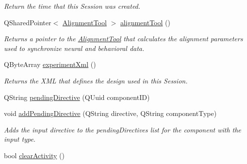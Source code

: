 \begin{DoxyCompactItemize}
\begin{DoxyCompactList}\small\item\em Return the time that this Session was created. \end{DoxyCompactList}\item 
\hypertarget{class_session_info_a2e1de58e8d906893dcc032d7e64a56ec}{Q\-Shared\-Pointer$<$ \hyperlink{class_alignment_tool}{Alignment\-Tool} $>$ \hyperlink{class_session_info_a2e1de58e8d906893dcc032d7e64a56ec}{alignment\-Tool} ()}\label{class_session_info_a2e1de58e8d906893dcc032d7e64a56ec}

\begin{DoxyCompactList}\small\item\em Returns a pointer to the \hyperlink{class_alignment_tool}{Alignment\-Tool} that calculates the alignment parameters used to synchronize neural and behavioral data. \end{DoxyCompactList}\item 
\hypertarget{class_session_info_a593b3687ba0495289109aa1b314ff718}{Q\-Byte\-Array \hyperlink{class_session_info_a593b3687ba0495289109aa1b314ff718}{experiment\-Xml} ()}\label{class_session_info_a593b3687ba0495289109aa1b314ff718}

\begin{DoxyCompactList}\small\item\em Returns the X\-M\-L that defines the design used in this Session. \end{DoxyCompactList}\item 
Q\-String \hyperlink{class_session_info_ae276671aa1731856342b9ca9ab4b5304}{pending\-Directive} (Q\-Uuid component\-I\-D)
\item 
\hypertarget{class_session_info_a2bd4edad0e169c5cd4e64723ade7208e}{void \hyperlink{class_session_info_a2bd4edad0e169c5cd4e64723ade7208e}{add\-Pending\-Directive} (Q\-String directive, Q\-String component\-Type)}\label{class_session_info_a2bd4edad0e169c5cd4e64723ade7208e}

\begin{DoxyCompactList}\small\item\em Adds the input directive to the pending\-Directives list for the component with the input type. \end{DoxyCompactList}\item 
\hypertarget{class_session_info_ae7431425acb759a827c3a9124b0a8d24}{bool \hyperlink{class_session_info_ae7431425acb759a827c3a9124b0a8d24}{clear\-Activity} ()}\label{class_session_info_ae7431425acb759a827c3a9124b0a8d24}


\end{DoxyCompactItemize}
